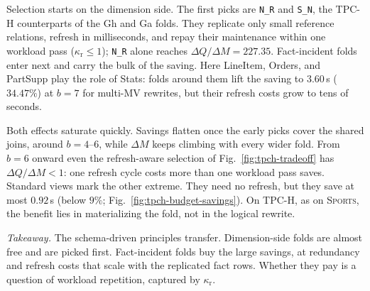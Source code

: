\documentclass[sigconf]{acmart}
\begin{document}
Selection starts on the dimension side. The first picks are \texttt{N\_R} and \texttt{S\_N}, the TPC-H counterparts of the Gh and Ga folds. They replicate only small reference relations, refresh in milliseconds, and repay their maintenance within one workload pass ($\kappa_{\mathrm r}\le 1$); \texttt{N\_R} alone reaches $\Delta Q/\Delta M=227.35$. Fact-incident folds enter next and carry the bulk of the saving. Here \textsf{LineItem}, \textsf{Orders}, and \textsf{PartSupp} play the role of \textsf{Stats}: folds around them lift the saving to $3.60$\,s ($34.47\%$) at $b=7$ for multi-MV rewrites, but their refresh costs grow to tens of seconds.

Both effects saturate quickly. Savings flatten once the early picks cover the shared joins, around $b=4$--$6$, while $\Delta M$ keeps climbing with every wider fold. From $b=6$ onward even the refresh-aware selection of Fig.~\ref{fig:tpch-tradeoff} has $\Delta Q/\Delta M<1$: one refresh cycle costs more than one workload pass saves. Standard views mark the other extreme. They need no refresh, but they save at most $0.92$\,s (below $9\%$; Fig.~\ref{fig:tpch-budget-savings}). On TPC-H, as on \textsc{Sports}, the benefit lies in materializing the fold, not in the logical rewrite.

\noindent\emph{Takeaway.} The schema-driven principles transfer. Dimension-side folds are almost free and are picked first. Fact-incident folds buy the large savings, at redundancy and refresh costs that scale with the replicated fact rows. Whether they pay is a question of workload repetition, captured by $\kappa_{\mathrm r}$.
\end{document}
